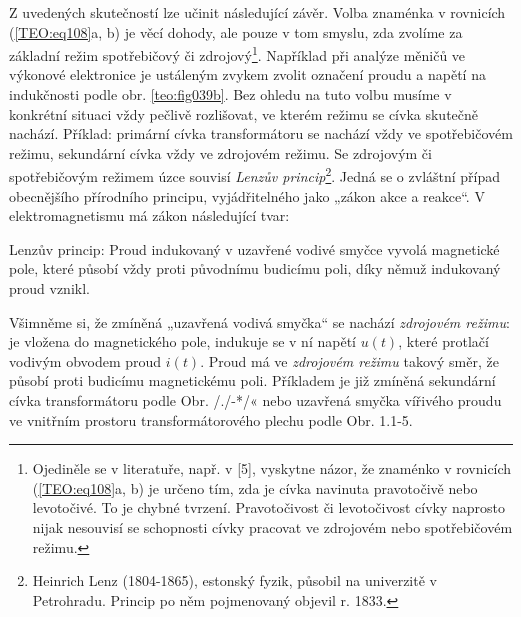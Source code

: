 
    Z uvedených skutečností lze učinit následující závěr. Volba znaménka v rovnicích
    (\ref{TEO:eq108}a, b) je věcí dohody, ale pouze v tom smyslu, zda zvolíme za základní
    režim spotřebičový či zdrojový\footnote{Ojediněle se v literatuře, např. v [5], vyskytne názor,
    že znaménko v rovnicích (\ref{TEO:eq108}a, b) je určeno tím, zda je cívka navinuta
    pravotočivě nebo levotočivé. To je chybné tvrzení. Pravotočivost či levotočivost cívky naprosto
    nijak nesouvisí se schopnosti cívky pracovat ve zdrojovém nebo spotřebičovém režimu.}. 
    Například při analýze měničů ve výkonové elektronice je ustáleným zvykem zvolit označení proudu
    a napětí na indukčnosti podle obr. \ref{teo:fig039b}. Bez ohledu na tuto volbu musíme v 
    konkrétní situaci vždy pečlivě rozlišovat, ve kterém režimu se cívka skutečně nachází.
    Příklad: primární cívka transformátoru se nachází vždy ve spotřebičovém režimu, sekundární
    cívka vždy ve zdrojovém režimu. Se zdrojovým či spotřebičovým režimem úzce souvisí \emph{Lenzův
    princip}\footnote{Heinrich Lenz (1804-1865), estonský fyzik, působil na univerzitě v
    Petrohradu. Princip po něm pojmenovaný objevil r. 1833.}. Jedná se o zvláštní případ
    obecnějšího přírodního principu, vyjádřitelného jako „zákon akce a reakce“. V elektromagnetismu
    má zákon následující tvar:

    Lenzův princip: Proud indukovaný v uzavřené vodivé smyčce vyvolá magnetické pole, které působí
    vždy proti původnímu budicímu poli, díky němuž indukovaný proud vznikl.

    Všimněme si, že zmíněná „uzavřená vodivá smyčka“ se nachází \emph{zdrojovém režimu}: je vložena
    do magnetického pole, indukuje se v ní napětí \(u(t)\), které protlačí vodivým obvodem proud
    \(i(t)\). Proud má ve \emph{zdrojovém režimu} takový směr, že působí proti budicímu magnetickému
    poli. Příkladem je již zmíněná sekundární cívka transformátoru podle Obr. /./-*/« nebo uzavřená
    smyčka vířivého proudu ve vnitřním prostoru transformátorového plechu podle Obr. 1.1-5.


